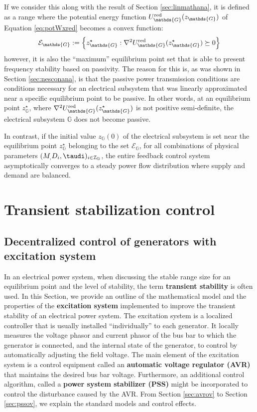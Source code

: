 \documentclass[graybox, envcountchap]{svmult}
\begin{document}
If we consider this along with the result of Section \ref{sec:linmathana}, it is defined as a range where the potential energy function $U_{\mathds{G}}^{\rm red} (z_{\mathds{G}})$ of Equation \ref{eq:potWxred} becomes a convex function:
\[
\mathcal{E}_{\mathds{G}}:=
\left\{
z_{\mathds{G}}^{\star} : \nabla^2 U_{\mathds{G}}^{\rm red} (z_{\mathds{G}}^{\star}) 
\succeq 0
\right\}
\]
however, it is also the “maximum” equilibrium point set that is able to present frequency stability based on passivity.
The reason for this is, as was shown in Section \ref{sec:nesconana}, is that the passive power transmission conditions are conditions necessary for an electrical subsystem that was linearly approximated near a specific equilibrium point to be passive.
In other words, at an equilibrium point $z_{\mathds{G}}^{\star}$, where $\nabla^2 U_{\mathds{G}}^{\rm red} (z_{\mathds{G}}^{\star}) $ is not positive semi-definite, the electrical subsystem $\mathds{G}$ does not become passive.

In contrast, if the initial value $z_{\mathds{G}}(0)$ of the electrical subsystem is set near the equilibrium point $z_{\mathds{G}}^{\star}$ belonging to the set $\mathcal{E}_{\mathds{G}}$,
for all combinations of physical parameters $(M_,D_i,\taudi)_{i \in \mathcal{I}_{\rm G}}$,
the entire feedback control system asymptotically converges to a steady power flow distribution where supply and demand are balanced.

\section{Transient stabilization control}\label{sec:transcont}

\subsection{Decentralized control of generators with excitation system}

In an electrical power system, when discussing the stable range size for an equilibrium point and the level of stability, the term \textbf{transient stability} is often used.
In this Section, we provide an outline of the mathematical model and the properties of the \textbf{excitation system} implemented to improve the transient stability of an electrical power system.
The excitation system is a localized controller that is usually installed “individually” to each generator.
It locally measures the voltage phasor and current phasor of the bus bar to which the generator is connected, and the internal state of the generator, to control by automatically adjusting the field voltage. The main element of the excitation system is a control equipment called an \textbf{automatic voltage regulator (AVR)} that maintains the desired bus bar voltage. Furthermore, an additional control algorithm, called a \textbf{power system stabilizer (PSS)} might be incorporated to control the disturbance caused by the AVR.
From Section \ref{sec:avrov} to Section \ref{sec:pssov}, we explain the standard models and control effects.
\end{document}
